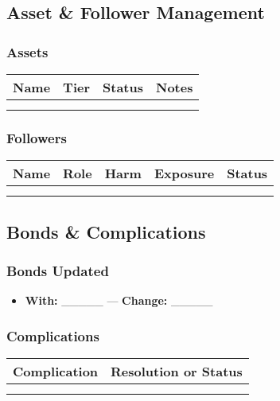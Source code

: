 \begin{multicols}{2}
\subsection{Asset \& Follower Management}
\subsubsection*{Assets}
\begin{tabular}{|p{4cm}|p{2cm}|p{2cm}|p{2.2cm}|}
\hline
\textbf{Name} & \textbf{Tier} & \textbf{Status} & \textbf{Notes} \\
\hline
 & & & \\
 & & & \\
\hline
\end{tabular}

\subsubsection*{Followers}
\begin{tabular}{|p{3.2cm}|p{2cm}|p{1.4cm}|p{1.6cm}|p{2cm}|}
\hline
\textbf{Name} & \textbf{Role} & \textbf{Harm} & \textbf{Exposure} & \textbf{Status} \\
\hline
 & & & & \\
 & & & & \\
\hline
\end{tabular}

\subsection{Bonds \& Complications}
\subsubsection*{Bonds Updated}
\begin{itemize}
  \item \textbf{With:} \_\_\_\_\_ — \textbf{Change:} \_\_\_\_\_
\end{itemize}
\subsubsection*{Complications}
\begin{tabular}{|p{5cm}|p{5cm}|}
\hline
\textbf{Complication} & \textbf{Resolution or Status} \\
\hline
 &  \\
 &  \\
\hline
\end{tabular}


\end{multicols}
